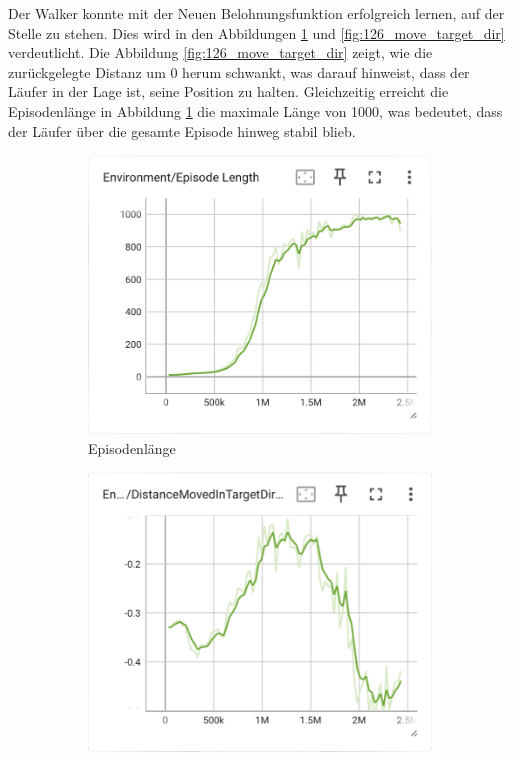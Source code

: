 Der Walker konnte mit der Neuen Belohnungsfunktion erfolgreich lernen, auf der Stelle zu stehen. Dies wird in den Abbildungen \ref{fig:126_episode_length} und \ref{fig:126_move_target_dir} verdeutlicht. Die Abbildung \ref{fig:126_move_target_dir} zeigt, wie die zurückgelegte Distanz um 0 herum schwankt, was darauf hinweist, dass der Läufer in der Lage ist, seine Position zu halten. Gleichzeitig erreicht die Episodenlänge in Abbildung \ref{fig:126_episode_length} die maximale Länge von 1000, was bedeutet, dass der Läufer über die gesamte Episode hinweg stabil blieb.
\begin{figure}[H]
  \centering  
  \begin{subfigure}{.49\textwidth}
      \centering  
      \includegraphics[width=\textwidth]{img/126_episode_length}
      \caption{Episodenlänge}
      \label{fig:126_episode_length}
    \end{subfigure}
    \begin{subfigure}{.49\textwidth}
      \centering  
      \includegraphics[width=\textwidth]{img/126_move_target_dir}

\end{subfigure}
\end{figure}
